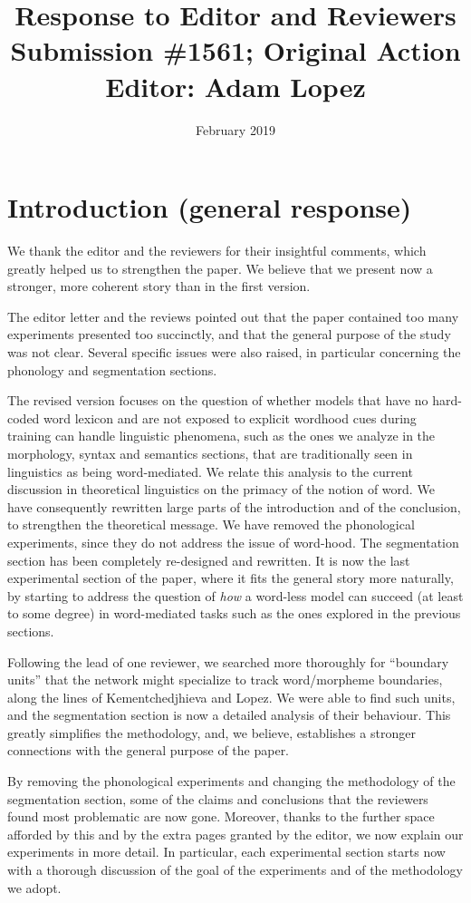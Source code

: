 \documentclass{article}[11pt,a4paper,oneside]
\title{Response to Editor and Reviewers \\ {\large Submission \#1561; Original Action Editor: Adam Lopez}}
\date{February 2019}
\begin{document}
\maketitle


\section{Introduction (general response)}

We thank the editor and the reviewers for their insightful comments, which greatly helped us to strengthen the paper. We believe that we present now a stronger, more coherent story than in the first version.

The editor letter and the reviews pointed out that the paper contained too many experiments presented too succinctly, and that the general purpose of the study was not clear. Several specific issues were also raised, in particular concerning the phonology and segmentation sections.

The revised version focuses on the question of whether models that have no hard-coded word lexicon and are not exposed to explicit wordhood cues during training can handle linguistic phenomena, such as the ones we analyze in the morphology, syntax and semantics sections, that are traditionally seen in linguistics as being word-mediated. We relate this analysis to the current discussion in theoretical linguistics on the primacy of the notion of word. We have consequently rewritten large parts of the introduction and of the conclusion, to strengthen the theoretical message. We have removed the phonological experiments, since they do not address the issue of word-hood. The segmentation section has been completely re-designed and rewritten. It is now the last experimental section of the paper, where it fits the general story more naturally, by starting to address the question of \emph{how} a word-less model can succeed (at least to some degree) in word-mediated tasks such as the ones explored in the previous sections.

Following the lead of one reviewer, we searched more thoroughly for ``boundary units'' that the network might specialize to track word/morpheme boundaries, along the lines of Kementchedjhieva and Lopez. We were able to find such units, and the segmentation section is now a detailed analysis of their behaviour. This greatly simplifies the methodology, and, we believe, establishes a stronger connections with the general purpose of the paper.

By removing the phonological experiments and changing the methodology of the segmentation section, some of the claims and conclusions that the reviewers found most problematic are now gone. Moreover, thanks to the further space afforded by this and by the extra pages granted by the editor, we now explain our experiments in more detail. In particular, each experimental section starts now with a thorough discussion of the goal of the experiments and of the methodology we adopt.
\end{document}
